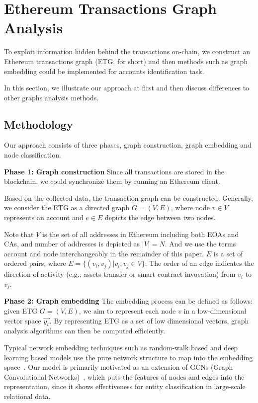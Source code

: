 
\section{Ethereum Transactions Graph Analysis}
To exploit information hidden behind the transactions on-chain, we construct an Ethereum transactions graph (ETG, for short) and then methods such as graph embedding could be implemented for accounts identification task.

In this section, we illustrate our approach at first and then discuss differences to other graphs analysis methods.

\subsection{Methodology}
\label{subsec:methodology}
Our approach consists of three phases, graph construction, graph embedding and node classification.

\textbf{Phase 1: Graph construction}
Since all transactions are stored in the blockchain, we could synchronize them by running an Ethereum client.

 Based on the collected data, the transaction graph can be constructed. Generally, we consider the ETG as a directed graph $G=(V,E)$, where node $v \in V$ represents an account and $e \in E$ depicts the edge between two nodes.

Note that $V$ is the set of all addresses in Ethereum including both EOAs and CAs, and number of addresses is depicted as $|V|=N$. And we use the terms account and node interchangeably in the remainder of this paper. $E$ is a set of ordered pairs, where $E=\{(v_i,v_j)|v_i,v_j \in V\}$. The order of an edge indicates the direction of activity (e.g., assets transfer or smart contract invocation) from $v_i$ to $v_j$. %



\textbf{Phase 2: Graph embedding}
The embedding process can be defined as follows: given ETG $G=(V,E)$, we aim to represent each node $v$ in a low-dimensional vector space $\vec{y_v}$. By representing ETG as a set of low dimensional vectors, graph analysis algorithms can then be computed efficiently.

Typical network embedding techniques such as random-walk based and deep learning based models use the pure network structure to map into the embedding space~\cite{goyal2018capturing}. Our model is primarily motivated as an extension of GCNs (Graph Convolutional Networks)~\cite{kipf2016semi,schlichtkrull2018modeling}, which puts the features of nodes and edges into the representation, since it shows effectiveness for entity classification in large-scale relational data.

